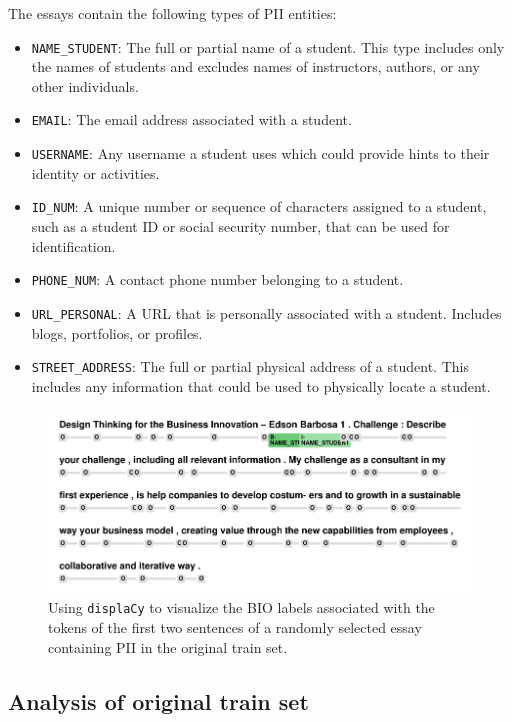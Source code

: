 \documentclass[11pt]{article}
\begin{document}
The essays contain the following types of PII entities:

\begin{itemize}
  \item \texttt{NAME\_STUDENT}: The full or partial name of a student. This type includes only the names of students and excludes names of instructors, authors, or any other individuals.
  \item \texttt{EMAIL}: The email address associated with a student.
  \item \texttt{USERNAME}: Any username a student uses which could provide hints to their identity or activities.
  \item \texttt{ID\_NUM}: A unique number or sequence of characters assigned to a student, such as a student ID or social security number, that can be used for identification.
  \item \texttt{PHONE\_NUM}: A contact phone number belonging to a student.
  \item \texttt{URL\_PERSONAL}: A URL that is personally associated with a student. Includes blogs, portfolios, or profiles.
  \item \texttt{STREET\_ADDRESS}: The full or partial physical address of a student. This includes any information that could be used to physically locate a student.
\end{itemize}

\begin{figure}[t]
  \centering
  \includegraphics[width=1.0\linewidth]{images/label_visualization.pdf}
  \caption{Using \texttt{displaCy} to visualize the BIO labels associated with the tokens of the first two sentences of a randomly selected essay containing PII in the original train set.}
  \label{fig:label_visualization}
\end{figure}

\subsection{Analysis of original train set}
\end{document}
